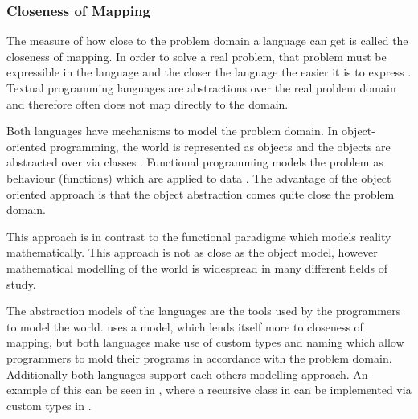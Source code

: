 \subsubsection{Closeness of Mapping}
The measure of how close to the problem domain a language can get is called the closeness of mapping. In order to solve a real problem, that problem must be expressible in the language and the closer the language the easier it is to express \cite{green1996usability}. Textual programming languages are abstractions over the real problem domain and therefore often does not map directly to the domain.

Both languages have mechanisms to model the problem domain. In object-oriented programming, the world is represented as objects and the objects are abstracted over via classes \cite{kindler2011object}. Functional programming models the problem as behaviour (functions) which are applied to data \cite{hughes1989functional}. The advantage of the object oriented approach is that the object abstraction comes quite close the problem domain.


This approach is in contrast to the functional paradigme which models reality mathematically. This approach is not as close as the object model, however mathematical modelling of the world is widespread in many different fields of study.


The abstraction models of the languages are the tools used by the programmers to model the world. \cs uses a model, which lends itself more to closeness of mapping, but both languages make use of custom types and naming which allow programmers to mold their programs in accordance with the problem domain. Additionally both languages support each others modelling approach. An example of this can be seen in , where a recursive class in \cs can be implemented via custom types in \fs.

